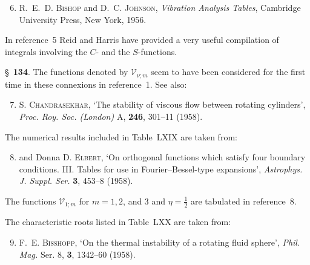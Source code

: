 \begin{enumerate}
\setcounter{enumi}{5}
\item R.~E.~D. \textsc{Bishop} and D.~C. \textsc{Johnson}, \textit{Vibration Analysis Tables}, Cambridge
University Press, New York, 1956.
\end{enumerate}

\noindent In reference~5 Reid and Harris have provided a very useful compilation of
integrals involving the $C$- and the $S$-functions.

\noindent\S~\textbf{134}. The functions denoted by $\mathscr{V}_{\nu;m}$ seem to have been considered for the first
time in these connexions in reference~1. See also:

\begin{enumerate}
\setcounter{enumi}{6}
\item S. \textsc{Chandrasekhar}, `The stability of viscous flow between rotating
cylinders', \textit{Proc. Roy. Soc. (London)} A, \textbf{246}, 301--11 (1958).
\end{enumerate}

\noindent The numerical results included in Table~LXIX are taken from:

\begin{enumerate}
\setcounter{enumi}{7}
\item \textemdash\textemdash{} and Donna D. \textsc{Elbert}, `On orthogonal functions which satisfy four
boundary conditions. III. Tables for use in Fourier--Bessel-type expansions', \textit{Astrophys. J. Suppl. Ser.} \textbf{3}, 453--8 (1958).
\end{enumerate}

\noindent The functions $\mathscr{V}_{1;m}$ for $m = 1, 2$, and 3 and $\eta = \frac{1}{2}$ are tabulated in reference~8.

\noindent The characteristic roots listed in Table~LXX are taken from:

\begin{enumerate}
\setcounter{enumi}{8}
\item F.~E. \textsc{Bisshopp}, `On the thermal instability of a rotating fluid sphere',
\textit{Phil. Mag.} Ser. 8, \textbf{3}, 1342--60 (1958).
\end{enumerate}
